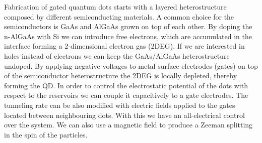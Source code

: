 Fabrication of gated quantum dots starts with a layered heterostructure composed by different semiconducting materials. A common choice for the semiconductors is GaAs and AlGaAs grown on top of each other. By doping the n-AlGaAs with Si we can introduce free electrons, which are accumulated in the interface forming a 2-dimensional electron gas (2DEG)\cite{Elzerman2005}. If we are interested in holes instead of electrons we can keep the GaAs/AlGaAs heterostructure undoped\cite{Tracy2014}. By applying negative voltages to metal surface electrodes (gates) on top of the semiconductor heterostructure the 2DEG is locally depleted, thereby forming the QD. In order to control the electrostatic potential of the dots with respect to the reservoirs we can couple it capacitively to a gate electrodes. The tunneling rate can be also modified with electric fields applied to the gates located between neighbouring dots. With this we have an all-electrical control over the system. We can also use a magnetic field to produce a Zeeman splitting in the spin of the particles.

